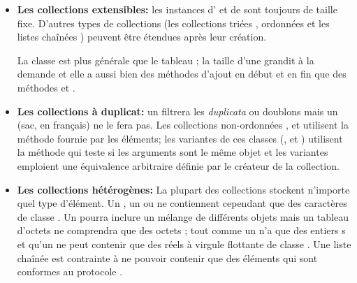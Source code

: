 \documentclass[a4paper,10pt,twoside]{book}
\begin{document}
\begin{itemize}
  \item {\bf Les collections extensibles:}
	les instances d' et de  sont
toujours de taille fixe. D'autres types de collections (les collections triées , ordonnées  et les listes chaînées ) peuvent être étendues après leur création.
	
	La classe  est plus générale que le tableau \mbox{;} la taille d'une  grandit à la demande et
elle a aussi bien des méthodes d'ajout en début  et en fin  que des méthodes
 et .
  
  \item {\bf Les collections à duplicat:}
  	un  filtrera les \emph{duplicata} ou doublons mais un  (sac, en français) ne le fera pas.
	Les collections non-ordonnées ,  et  utilisent la méthode
\ct{=} fournie par les éléments; les variantes  de ces
classes (,  et )
utilisent la méthode \ct{==} qui teste si les arguments sont 
le même objet et les variantes  emploient une équivalence
arbitraire définie par le créateur de la collection.

  \item {\bf Les collections hétérogènes:}
	La plupart des collections stockent n'importe quel type d'élément.
	Un , un  ou  ne contiennent cependant que des caractères de classe .
	Un  pourra inclure un mélange de différents objets
 mais un tableau d'octets  ne comprendra que des 
octets ; tout comme un  n'a que des entiers s et qu'un  ne peut contenir que des réels à virgule flottante de classe .
	Une liste chaînée  est contrainte à ne 
pouvoir contenir que des éléments qui sont conformes au protocole
.

\end{itemize}

\end{document}
